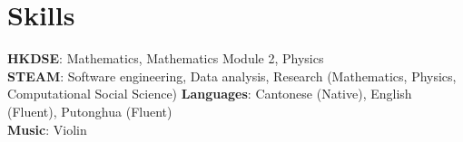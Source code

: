 \documentclass[letterpaper,11pt]{article}
\begin{document}
%
\section{Skills}
 \begin{itemize}[leftmargin=0.15in, label={}]
    \small{\item{
     \textbf{HKDSE}{: Mathematics, Mathematics Module 2, Physics} \\
     \textbf{STEAM}{: Software engineering, Data analysis, Research (Mathematics, Physics, Computational Social Science)}
     \textbf{Languages}{: Cantonese (Native), English (Fluent), Putonghua (Fluent)} \\
     \textbf{Music}{: Violin}
    }}
 \end{itemize}


\end{document}
